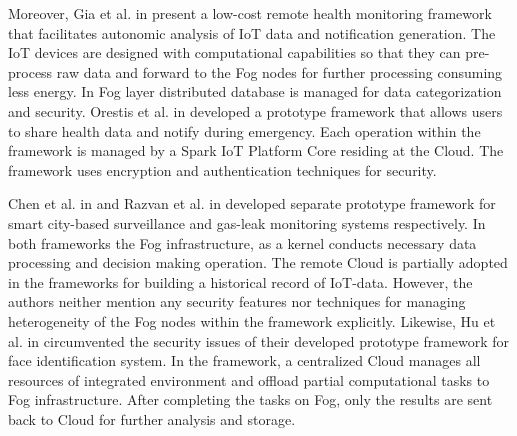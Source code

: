 \documentclass[final,5p,times,twocolumn]{elsarticle}
\begin{document}
%
\par Moreover, Gia et al. in \cite{Gia} present a low-cost remote health monitoring framework that facilitates autonomic analysis of IoT data and notification generation. The IoT devices are designed with computational capabilities so that they can pre-process raw data and forward to the Fog nodes for further processing consuming less energy. In Fog layer distributed database is managed for data categorization and security. Orestis et al. in \cite{Orestis} developed a prototype framework that allows users to share health data and notify during emergency. Each operation within the framework is managed by a Spark IoT Platform Core residing at the Cloud. The framework uses encryption and authentication techniques for security. 
%
\par Chen et al. in \cite{chen} and Razvan et al. in \cite{razvan} developed separate prototype framework for smart city-based surveillance and gas-leak monitoring systems respectively. In both frameworks the Fog infrastructure, as a kernel conducts necessary data processing and decision making operation. The remote Cloud is partially adopted in the frameworks for building a historical record of IoT-data. However, the authors neither mention any security features nor techniques for managing heterogeneity of the Fog nodes within the framework explicitly. Likewise, Hu et al. in \cite{Hu} circumvented  the security issues of their developed prototype framework for face identification system. In the framework, a centralized Cloud manages all resources of integrated environment and offload partial computational tasks to Fog infrastructure. After completing the tasks on Fog, only the results are sent back to Cloud for further analysis and storage.
%
   
\end{document}
